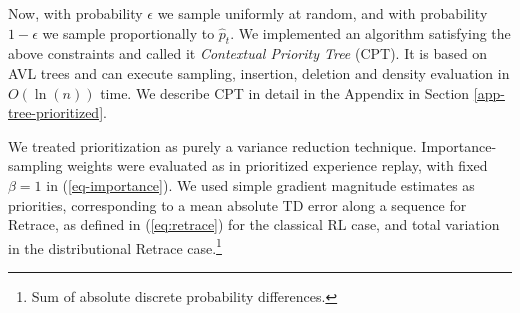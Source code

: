 \documentclass{article}
\begin{document}
Now, with probability 
$\epsilon$ we sample uniformly at random, and with probability $1 - \epsilon$ 
we sample proportionally to $\hat p_{t}$.
We implemented an algorithm 
satisfying the above constraints and called it \textit{Contextual Priority 
Tree} (CPT). It is based on AVL trees 
\citep{velskii1976avl} and can execute sampling, insertion, deletion and 
density evaluation in $O(\ln (n))$ time. We describe CPT in detail 
in the Appendix in Section \ref{app-tree-prioritized}.

We treated prioritization as purely a variance reduction technique. 
Importance-sampling weights were evaluated as in prioritized 
experience replay, with fixed $\beta = 1$ in (\ref{eq-importance}). We 
used simple gradient magnitude estimates as priorities, corresponding to a mean 
absolute TD error along a sequence for Retrace, as defined in (\ref{eq:retrace}) 
for the classical RL case, and total variation 
in the distributional Retrace case.\footnote{Sum of absolute discrete probability differences.}
\end{document}

